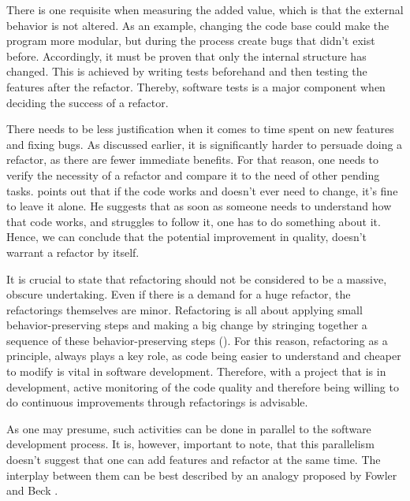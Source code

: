 There is one requisite when measuring the added value,
	which is that the external behavior is not altered. 
As an example, changing the code base could make the program more modular, 
	but during the process create bugs that didn't exist before. 
Accordingly, it must be proven that only the internal structure has changed.
This is achieved by writing tests beforehand and then testing the features after the refactor.
Thereby, software tests is a major component when deciding the success of a refactor.




There needs to be less justification when it comes to time spent on new features and fixing bugs.
As discussed earlier, it is significantly harder to persuade doing a refactor, 
	as there are fewer immediate benefits.
For that reason, one needs to verify the necessity of a refactor 
	and compare it to the need of other pending tasks.
\textcite[p.~5]{fowler2018} points out that if the code works and doesn't ever need to change, 
	it's fine to leave it alone.
He suggests that as soon as someone needs to understand how that code works, 
	and struggles to follow it, one has to do something about it.
Hence, we can conclude that the potential improvement in quality, doesn't warrant a refactor by itself.

It is crucial to state that refactoring should not be considered to be a massive, obscure undertaking.
Even if there is a demand for a huge refactor, the refactorings themselves are minor.
Refactoring is all about applying small behavior-preserving steps and making a big change by stringing together a sequence of these behavior-preserving steps (\cite[p.~45]{fowler2018}). 
For this reason, refactoring as a principle, 
	always plays a key role, 
	as code being easier to understand and cheaper to modify is vital in software development.
Therefore, with a project that is in development, 
	active monitoring of the code quality and therefore being willing to do continuous improvements 
	through refactorings is advisable.

As one may presume, such activities can be done in parallel to the software development process.
It is, however, important to note, 
	that this parallelism doesn't suggest that one can add features and refactor at the same time.
The interplay between them can be best described by an analogy proposed by Fowler and Beck \textcite[p.~47]{fowler2018}. 

